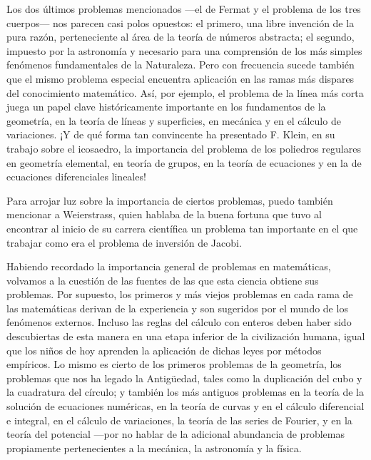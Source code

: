 \documentclass[a4paper, 12pt]{article}
\begin{document}
Los dos últimos problemas mencionados ---el de Fermat y el problema de los tres cuerpos--- nos parecen casi polos opuestos: el primero, una libre invención de la pura razón, perteneciente al área de la teoría de números abstracta; el segundo, impuesto por la astronomía y necesario para una comprensión de los más simples fenómenos fundamentales de la Naturaleza.  Pero con frecuencia sucede también que el mismo problema especial  encuentra aplicación en las ramas más dispares del conocimiento matemático. Así, por ejemplo, el problema de la línea más corta juega un papel clave históricamente importante en los fundamentos de la geometría, en la teoría de líneas y superficies, en mecánica y en el cálculo de variaciones. ¡Y de qué forma tan convincente ha presentado F. Klein, en su trabajo sobre el icosaedro, la importancia del problema de los poliedros regulares en geometría elemental, en teoría de grupos, en la teoría de  ecuaciones y en la de ecuaciones diferenciales lineales! 


Para arrojar luz sobre la importancia de ciertos problemas, puedo también mencionar a Weierstrass, quien hablaba de la buena fortuna que  tuvo al encontrar al inicio de su carrera científica un problema tan importante en el que trabajar como era el problema de inversión de Jacobi. 

Habiendo recordado la importancia general de problemas en matemá\-ticas, volvamos a la cuestión de las fuentes de las que esta ciencia obtiene sus problemas. Por supuesto, los primeros y más viejos problemas  en cada rama de las matemáticas derivan de la experiencia y son sugeridos por el mundo de los fenómenos externos. Incluso las reglas del cálculo con enteros deben haber sido descubiertas de esta manera en una etapa inferior de la civilización humana, igual que los niños de hoy aprenden la aplicación de dichas leyes por métodos empíricos. Lo mismo es cierto de los primeros problemas de la geometría, los problemas que nos ha legado la Antigüedad, tales como la duplicación del cubo y la cuadratura del círculo; y también los más antiguos problemas en la teoría de la solución de ecuaciones numéricas, en la teoría de curvas y en el cálculo diferencial e integral, en el cálculo de variaciones, la teoría de las series de Fourier, y en la teoría del potencial ---por no hablar de la adicional abundancia de problemas propiamente pertenecientes a la mecánica, la astronomía y la física. 
 
\end{document}
